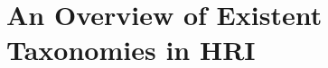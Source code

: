 \documentclass[letterpaper, 10 pt, conference]{ieeeconf}  %
\theoremstyle{definition}
\begin{document}

\section{An Overview of Existent Taxonomies in HRI}
\label{sec:overview}
\end{document}
